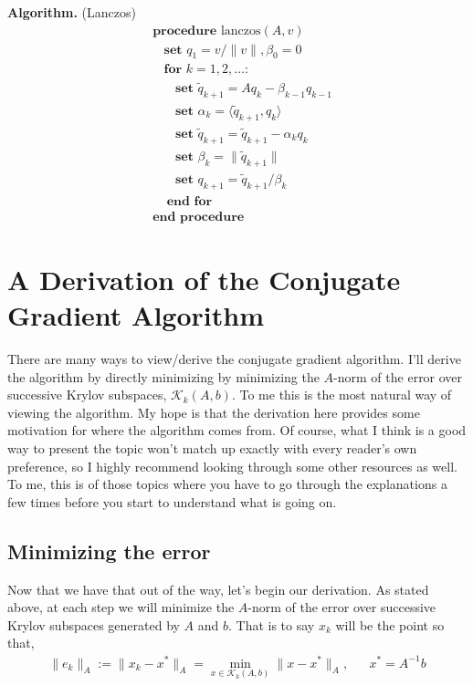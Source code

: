 \documentclass[10pt]{article}
\begin{document}
\textbf{Algorithm.} (Lanczos)
\begin{align*}
&\textbf{procedure}\text{ lanczos}( A,v ) 
\\[-.4em]&~~~~\textbf{set } q_1 = v / \|v\|, \beta_0 = 0
\\[-.4em]&~~~~\textbf{for } k=1,2,\ldots \textbf{:} 
\\[-.4em]&~~~~~~~~\textbf{set } \tilde{q}_{k+1} = Aq_k - \beta_{k-1} q_{k-1}
\\[-.4em]&~~~~~~~~\textbf{set } \alpha_k = \langle \tilde{q}_{k+1}, q_k \rangle
\\[-.4em]&~~~~~~~~\textbf{set } \tilde{q}_{k+1} = \tilde{q}_{k+1} - \alpha_k q_{k}
\\[-.4em]&~~~~~~~~\textbf{set } \beta_k = \| \tilde{q}_{k+1} \|
\\[-.4em]&~~~~~~~~\textbf{set } q_{k+1} = \tilde{q}_{k+1} / \beta_k
\\[-.4em]&~~~~~\textbf{end for}
\\[-.4em]&\textbf{end procedure}
\end{align*}

\section{A Derivation of the Conjugate Gradient Algorithm}

There are many ways to view/derive the conjugate gradient algorithm.
I'll derive the algorithm by directly minimizing by minimizing the \(A\)-norm of the error over successive Krylov subspaces, \(\mathcal{K}_k(A,b)\).
To me this is the most natural way of viewing the algorithm.
My hope is that the derivation here provides some motivation for where the algorithm comes from.
Of course, what I think is a good way to present the topic won't match up exactly with every reader's own preference, so I highly recommend looking through some other resources as well.
To me, this is of those topics where you have to go through the explanations a few times before you start to understand what is going on.

\subsection{Minimizing the error}

Now that we have that out of the way, let's begin our derivation.
As stated above, at each step we will minimize the \(A\)-norm of the error over successive Krylov subspaces generated by \(A\) and \(b\).
That is to say \(x_k\) will be the point so that,
\begin{align*}
\|e_k\|_A
:=\| x_k - x^* \|_A 
= \min_{x\in\mathcal{K}_k(A,b)} \| x - x^* \|_A
,&&
x^* = A^{-1}b
\end{align*}
\end{document}
